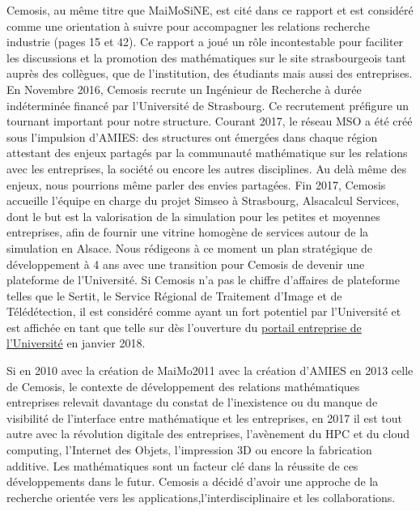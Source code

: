 Cemosis, au même titre que MaiMoSiNE, est cité dans ce rapport et est considéré comme une orientation à suivre pour accompagner les relations recherche industrie (pages 15 et 42). 
Ce rapport a joué un rôle incontestable pour faciliter les discussions et la promotion des mathématiques sur le site strasbourgeois tant auprès des collègues, que de l'institution, des étudiants mais aussi des entreprises.
En Novembre 2016, Cemosis recrute un Ingénieur de Recherche à durée indéterminée financé par l'Université de Strasbourg. Ce recrutement préfigure un tournant important pour notre structure.
Courant 2017, le réseau MSO a été créé sous l'impulsion d'AMIES: des structures ont émergées dans chaque région attestant des enjeux partagés par la communauté mathématique sur les relations avec les entreprises, la société ou encore les autres disciplines. 
Au delà même des enjeux, nous pourrions même parler des envies partagées.
Fin 2017, Cemosis accueille l'équipe en charge du projet Simseo à Strasbourg, Alsacalcul Services, dont le but est la valorisation de la simulation pour les petites et moyennes entreprises, afin de fournir une vitrine homogène de services autour de la simulation en Alsace.
Nous rédigeons à ce moment un plan stratégique de développement à 4 ans avec une transition pour Cemosis de devenir une plateforme de l'Université. 
Si Cemosis n'a pas le chiffre d'affaires de plateforme telles que le Sertit, le Service Régional de Traitement d'Image et de Télédétection, il est considéré comme ayant un fort potentiel par l'Université et est affichée en tant que telle sur dès l'ouverture du \href{http://entreprises.unistra.fr/innover/decouvrir-les-plateformes-technologiques-de-luniversite/#c3136}{portail entreprise de l'Université} en janvier 2018.

Si en 2010 avec la création de MaiMo2011 avec la création d'AMIES  en 2013 celle de Cemosis, le contexte de développement des relations mathématiques entreprises relevait davantage du constat de l'inexistence ou du manque de visibilité de l'interface entre mathématique et les entreprises, en 2017 il est tout autre avec la révolution digitale des entreprises, l'avènement du HPC et du cloud computing, l'Internet des Objets, l'impression 3D ou encore la fabrication additive. Les mathématiques sont un facteur clé dans la réussite de ces développements dans le futur. Cemosis a décidé d'avoir une approche de la recherche orientée vers les applications,l'interdisciplinaire et les collaborations.
 
 

\vspace{1cm}